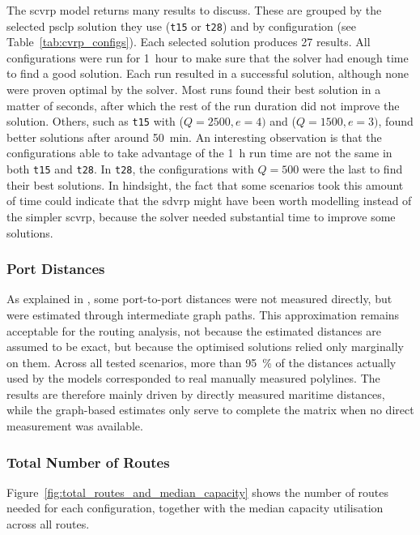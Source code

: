 \documentclass[12pt]{article}
\begin{document}
The \ac{scvrp} model returns many results to discuss. These are grouped by the selected \ac{psclp} solution they use (\texttt{t15} or \texttt{t28}) and by configuration (see Table~\ref{tab:cvrp_configs}). Each selected solution produces \num{27} results. All configurations were run for \qty{1}{hour} to make sure that the solver had enough time to find a good solution. Each run resulted in a successful solution, although none were proven optimal by the solver. Most runs found their best solution in a matter of seconds, after which the rest of the run duration did not improve the solution. Others, such as \texttt{t15} with (\(Q=2500, e=4)\) and (\(Q=1500, e=3)\), found better solutions after around \qty{50}{\minute}. An interesting observation is that the configurations able to take advantage of the \qty{1}{\hour} run time are not the same in both \texttt{t15} and \texttt{t28}. In \texttt{t28}, the configurations with \(Q=500\) were the last to find their best solutions. In hindsight, the fact that some scenarios took this amount of time could indicate that the \ac{sdvrp} might have been worth modelling instead of the simpler \ac{scvrp}, because the solver needed substantial time to improve some solutions.

\subsubsection{Port Distances}
\label{subsubsec:used-port-distances}

As explained in , some port-to-port distances were not measured directly, but were estimated through intermediate graph paths. This approximation remains acceptable for the routing analysis, not because the estimated distances are assumed to be exact, but because the optimised solutions relied only marginally on them. Across all tested scenarios, more than \qty{95}{\percent} of the distances actually used by the models corresponded to real manually measured polylines. The results are therefore mainly driven by directly measured maritime distances, while the graph-based estimates only serve to complete the matrix when no direct measurement was available.

\subsubsection{Total Number of Routes}
\label{subsubsec:total-number-routes}

Figure~\ref{fig:total_routes_and_median_capacity} shows the number of routes needed for each configuration, together with the median capacity utilisation across all routes.
\end{document}
